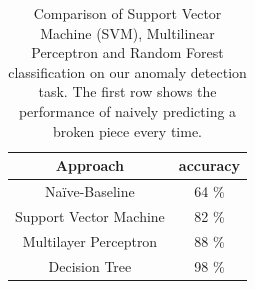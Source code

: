 \documentclass[5p,times,procedia]{elsarticle}
\begin{document}
\begin{table}
       \centering
       \begin{tabular}{ c c } \toprule
              Approach         & accuracy \\ \midrule
              Na\"ive-Baseline & 64 \% \\
              Support Vector Machine & 82 \% \\
              Multilayer Perceptron & 88 \% \\
              Decision Tree         & 98 \% \\ \bottomrule
       \end{tabular}
       \caption{Comparison of Support Vector Machine (SVM), Multilinear Perceptron and 
                Random Forest classification on our anomaly detection task. 
                The first row shows the performance of naively predicting a broken piece
                every time.}
       \label{tab:class_comp}
\end{table}
\end{document}
